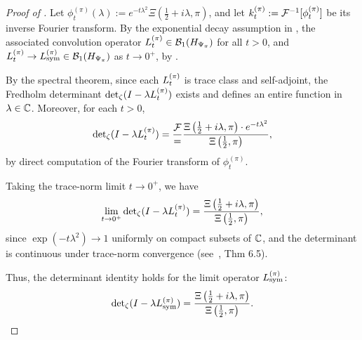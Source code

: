 \begin{proof}[Proof of ]
Let \( \phi_t^{(\pi)}(\lambda) := e^{-t\lambda^2} \Xi\left(\tfrac{1}{2} + i\lambda, \pi\right) \), and let \( k_t^{(\pi)} := \mathcal{F}^{-1}[\phi_t^{(\pi)}] \) be its inverse Fourier transform. By the exponential decay assumption in , the associated convolution operator \( L_t^{(\pi)} \in \mathcal{B}_1(H_{\Psi_{\pi}}) \) for all \( t > 0 \), and \( L_t^{(\pi)} \to L_{\mathrm{sym}}^{(\pi)} \in \mathcal{B}_1(H_{\Psi_{\pi}}) \) as \( t \to 0^+ \), by .

By the spectral theorem, since each \( L_t^{(\pi)} \) is trace class and self-adjoint, the Fredholm determinant \( \det\nolimits_{\zeta}(I - \lambda L_t^{(\pi)}) \) exists and defines an entire function in \( \lambda \in \mathbb{C} \). Moreover, for each \( t > 0 \),
\[
\det\nolimits_{\zeta}(I - \lambda L_t^{(\pi)}) = \frac{\mathcal{F} } 
= \frac{\Xi\left(\tfrac{1}{2} + i\lambda, \pi\right) \cdot e^{-t\lambda^2}}{\Xi\left(\tfrac{1}{2}, \pi\right)},
\]
by direct computation of the Fourier transform of \( \phi_t^{(\pi)} \).

Taking the trace-norm limit \( t \to 0^+ \), we have
\[
\lim_{t \to 0^+} \det\nolimits_{\zeta}(I - \lambda L_t^{(\pi)})
= \frac{\Xi\left(\tfrac{1}{2} + i\lambda, \pi\right)}{\Xi\left(\tfrac{1}{2}, \pi\right)},
\]
since \( \exp(-t\lambda^2) \to 1 \) uniformly on compact subsets of \( \mathbb{C} \), and the determinant is continuous under trace-norm convergence (see~\cite{Simon2005TraceIdeals}, Thm 6.5).

Thus, the determinant identity holds for the limit operator \( L_{\mathrm{sym}}^{(\pi)} \):
\[
\det\nolimits_{\zeta}(I - \lambda L_{\mathrm{sym}}^{(\pi)}) = \frac{\Xi\left(\tfrac{1}{2} + i\lambda, \pi\right)}{\Xi\left(\tfrac{1}{2}, \pi\right)}.
\]
\end{proof}
